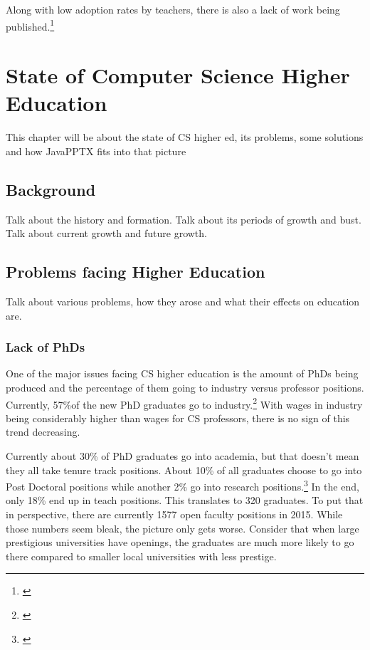 \documentclass[12pt,twoside]{reedthesis}
\begin{document}
Along with low adoption rates by teachers, there is also a lack of work being published.\footnote{\cite{kucera_visualization_2018}}  


\chapter{State of Computer Science Higher Education}	
This chapter will be about the state of CS higher ed, its problems, some solutions and how JavaPPTX fits into that picture

\section{Background}
Talk about the history and formation. Talk about its periods of growth and bust. Talk about current growth and future growth.

\section{Problems facing Higher Education}
Talk about various problems, how they arose and what their effects on education are.

\subsection{Lack of PhDs}
One of the major issues facing CS higher education is the amount of PhDs being produced and the percentage of them going to industry versus professor positions. Currently, 57\%of the new PhD graduates go to industry.\footnote{\cite{zweben_another_2018}} With wages in industry being considerably higher than wages for CS professors, there is no sign of this trend decreasing. 

Currently about 30\% of PhD graduates go into academia, but that doesn't mean they all take tenure track positions. About 10\% of all graduates choose to go into Post Doctoral positions while another 2\% go into research positions.\footnote{\cite{zweben_another_2018}} In the end, only 18\% end up in teach positions. This translates to 320 graduates. To put that in perspective, there are currently 1577 open faculty positions in 2015. While those numbers seem bleak, the picture only gets worse. Consider that when large prestigious universities have openings, the graduates are much more likely to go there compared to smaller local universities with less prestige. 
\end{document}
